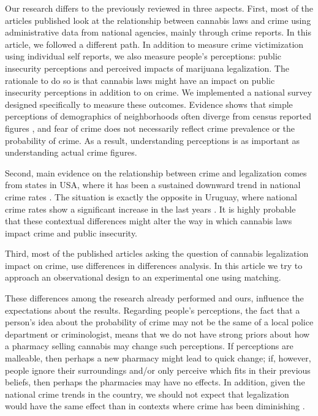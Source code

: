 \documentclass[11pt]{article}
\begin{document}
Our research differs to the previously reviewed in three aspects. First, most of the articles published look at the relationship between cannabis laws and crime using administrative data from national agencies, mainly through crime reports. In this article, we followed a different path. In addition to measure crime victimization using individual self reports, we also measure people's perceptions: public insecurity perceptions and perceived impacts of marijuana legalization. The rationale to do so is that cannabis laws might have an impact on public insecurity perceptions in addition to on crime. We implemented a national survey designed specifically to measure these outcomes. Evidence shows that simple perceptions of demographics of neighborhoods often diverge from census reported figures \citep{wong2012bringing}, and fear of crime does not necessarily reflect crime prevalence or the probability of crime. As a result, understanding perceptions is as important as understanding actual crime figures.

Second, main evidence on the relationship between crime and legalization comes from states in USA, where it has been a sustained downward trend in national crime rates \citep{gramlich5facts, james2018recent}. The situation is exactly the opposite in Uruguay, where national crime rates show a significant increase in the last years \citep{del2018obstacles, paternain2008panorama, aboal2007crimen}. It is highly probable that these contextual differences might alter the way in which cannabis laws impact crime and public insecurity.

Third, most of the published articles asking the question of cannabis legalization impact on crime, use differences in differences analysis. In this article we try to approach an observational design to an experimental one using matching.

These differences among the research already performed and ours, influence the expectations about the results. Regarding people's perceptions, the fact that a person's idea about the probability of crime may not be the same of a local police department or criminologist, means that we do not have strong priors about how a pharmacy selling cannabis may change such perceptions. If perceptions are malleable, then perhaps a new pharmacy might lead to quick change; if, however, people ignore their surroundings and/or only perceive which fits in their previous beliefs, then perhaps the pharmacies may have no effects. In addition, given the national crime trends in the country, we should not expect that legalization would have the same effect than in contexts where crime has been diminishing \citep{eisner2016achieving}.
\end{document}
